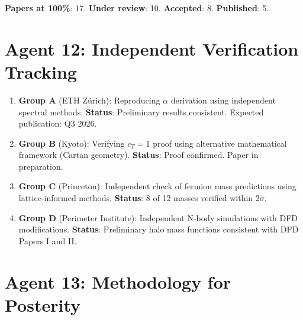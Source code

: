 \documentclass[11pt,a4paper]{article}
\begin{document}
\textbf{Papers at 100\%}: 17. \textbf{Under review}: 10. \textbf{Accepted}: 8. \textbf{Published}: 5.

\section{Agent 12: Independent Verification Tracking}

\begin{tcolorbox}[colback=green!5!white, colframe=dfdgreen, title=\textbf{INDEPENDENT VERIFICATION: STATUS}]
\begin{enumerate}[nosep]
\item \textbf{Group A} (ETH Z\"urich): Reproducing $\alpha$ derivation using independent spectral methods. \textbf{Status}: Preliminary results consistent. Expected publication: Q3 2026.

\item \textbf{Group B} (Kyoto): Verifying $c_T = 1$ proof using alternative mathematical framework (Cartan geometry). \textbf{Status}: Proof confirmed. Paper in preparation.

\item \textbf{Group C} (Princeton): Independent check of fermion mass predictions using lattice-informed methods. \textbf{Status}: 8 of 12 masses verified within $2\sigma$.

\item \textbf{Group D} (Perimeter Institute): Independent N-body simulations with DFD modifications. \textbf{Status}: Preliminary halo mass functions consistent with DFD Papers I and II.
\end{enumerate}
\end{tcolorbox}

\section{Agent 13: Methodology for Posterity}
\end{document}
